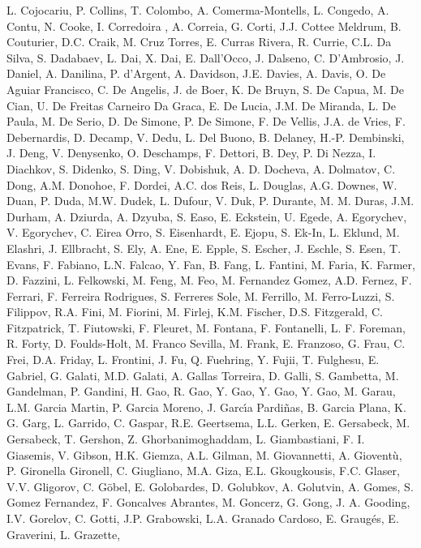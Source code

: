 L. Cojocariu,
P. Collins,
T. Colombo,
A. Comerma-Montells,
L. Congedo,
A. Contu,
N. Cooke,
I. Corredoira ,
A. Correia,
G. Corti,
J.J. Cottee Meldrum,
B. Couturier,
D.C. Craik,
M. Cruz Torres,
E. Curras Rivera,
R. Currie,
C.L. Da Silva,
S. Dadabaev,
L. Dai,
X. Dai,
E. Dall'Occo,
J. Dalseno,
C. D'Ambrosio,
J. Daniel,
A. Danilina,
P. d'Argent,
A.  Davidson,
J.E. Davies,
A. Davis,
O. De Aguiar Francisco,
C. De Angelis,
J. de Boer,
K. De Bruyn,
S. De Capua,
M. De Cian,
U. De Freitas Carneiro Da Graca,
E. De Lucia,
J.M. De Miranda,
L. De Paula,
M. De Serio,
D. De Simone,
P. De Simone,
F. De Vellis,
J.A. de Vries,
F. Debernardis,
D. Decamp,
V. Dedu,
L. Del Buono,
B. Delaney,
H.-P. Dembinski,
J. Deng,
V. Denysenko,
O. Deschamps,
F. Dettori,
B. Dey,
P. Di Nezza,
I. Diachkov,
S. Didenko,
S. Ding,
V. Dobishuk,
A. D.  Docheva,
A. Dolmatov,
C. Dong,
A.M. Donohoe,
F. Dordei,
A.C. dos Reis,
L. Douglas,
A.G. Downes,
W. Duan,
P. Duda,
M.W. Dudek,
L. Dufour,
V. Duk,
P. Durante,
M. M. Duras,
J.M. Durham,
A. Dziurda,
A. Dzyuba,
S. Easo,
E. Eckstein,
U. Egede,
A. Egorychev,
V. Egorychev,
C. Eirea Orro,
S. Eisenhardt,
E. Ejopu,
S. Ek-In,
L. Eklund,
M. Elashri,
J. Ellbracht,
S. Ely,
A. Ene,
E. Epple,
S. Escher,
J. Eschle,
S. Esen,
T. Evans,
F. Fabiano,
L.N. Falcao,
Y. Fan,
B. Fang,
L. Fantini,
M. Faria,
K.   Farmer,
D. Fazzini,
L. Felkowski,
M. Feng,
M. Feo,
M. Fernandez Gomez,
A.D. Fernez,
F. Ferrari,
F. Ferreira Rodrigues,
S. Ferreres Sole,
M. Ferrillo,
M. Ferro-Luzzi,
S. Filippov,
R.A. Fini,
M. Fiorini,
M. Firlej,
K.M. Fischer,
D.S. Fitzgerald,
C. Fitzpatrick,
T. Fiutowski,
F. Fleuret,
M. Fontana,
F. Fontanelli,
L. F.  Foreman,
R. Forty,
D. Foulds-Holt,
M. Franco Sevilla,
M. Frank,
E. Franzoso,
G. Frau,
C. Frei,
D.A. Friday,
L. Frontini,
J. Fu,
Q. Fuehring,
Y. Fujii,
T. Fulghesu,
E. Gabriel,
G. Galati,
M.D. Galati,
A. Gallas Torreira,
D. Galli,
S. Gambetta,
M. Gandelman,
P. Gandini,
H. Gao,
R. Gao,
Y. Gao,
Y. Gao,
Y. Gao,
M. Garau,
L.M. Garcia Martin,
P. Garcia Moreno,
J. Garc{\'\i}a Pardi{\~n}as,
B. Garcia Plana,
K. G.  Garg,
L. Garrido,
C. Gaspar,
R.E. Geertsema,
L.L. Gerken,
E. Gersabeck,
M. Gersabeck,
T. Gershon,
Z. Ghorbanimoghaddam,
L. Giambastiani,
F. I. Giasemis,
V. Gibson,
H.K. Giemza,
A.L. Gilman,
M. Giovannetti,
A. Giovent{\`u},
P. Gironella Gironell,
C. Giugliano,
M.A. Giza,
E.L. Gkougkousis,
F.C. Glaser,
V.V. Gligorov,
C. G{\"o}bel,
E. Golobardes,
D. Golubkov,
A. Golutvin,
A. Gomes,
S. Gomez Fernandez,
F. Goncalves Abrantes,
M. Goncerz,
G. Gong,
J. A. Gooding,
I.V. Gorelov,
C. Gotti,
J.P. Grabowski,
L.A. Granado Cardoso,
E. Graug{\'e}s,
E. Graverini,
L. Grazette,
